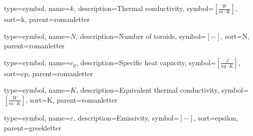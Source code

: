 {
	type=symbol, %
	name={\ensuremath{k}}, %
	description={Thermal conductivity}, %
	symbol={$\left[\frac{W}{m\cdot K}\right]$}, %
	sort=k, %
	parent=romanletter %
}

{
	type=symbol, %
	name={\ensuremath{N}}, %
	description={Number of toroids}, %
	symbol={$\left[-\right]$}, %
	sort=N, %
	parent=romanletter %
}

{
	type=symbol, %
	name={\ensuremath{c_p}}, %
	description={Specific heat capacity}, %
	symbol={$\left[\frac{J}{kg\cdot K}\right]$}, %
	sort=cp, %
	parent=romanletter %
}

{
	type=symbol, %
	name={\ensuremath{K}}, %
	description={Equivalent thermal conductivity}, %
	symbol={$\left[\frac{W}{m\cdot K}\right]$}, %
	sort=K, %
	parent=romanletter %
}

{
	type=symbol, %
	name={\ensuremath{\varepsilon}}, %
	description={Emissivity}, %
	symbol={$\left[-\right]$}, %
	sort=epsilon, %
	parent=greekletter %
}


